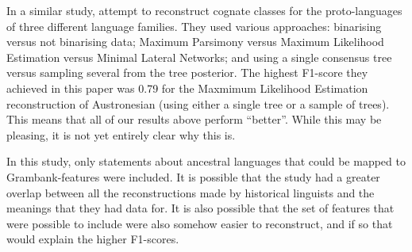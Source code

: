 \documentclass[draft,10pt]{article} %
\begin{document}
In a similar study, \citet{jager2018using} attempt to reconstruct cognate classes for the proto-languages of three different language families. They used various approaches: binarising versus not binarising data; Maximum Parsimony versus Maximum Likelihood Estimation versus Minimal Lateral Networks; and using a single consensus tree versus sampling several from the tree posterior. The highest F1-score they achieved in this paper was 0.79 for the Maxmimum Likelihood Estimation reconstruction of Austronesian (using either a single tree or a sample of trees). This means that all of our results above perform ``better''. While this may be pleasing, it is not yet entirely clear why this is. 

In this study, only statements about ancestral languages that could be mapped to Grambank-features were included. It is  possible that the \citet{jager2018using} study had a greater overlap between all the reconstructions made by historical linguists and the meanings that they had data for. It is also possible that the set of features that were possible to include were also somehow easier to reconstruct, and if so that would explain the higher F1-scores.
\end{document}
